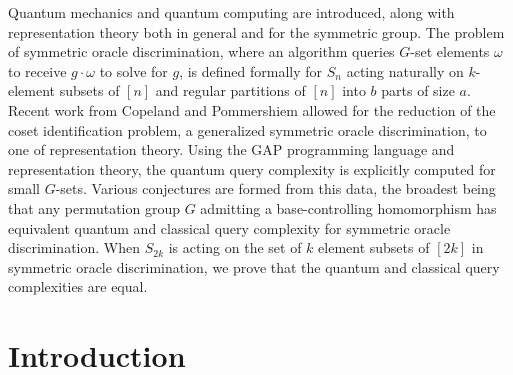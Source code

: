 \documentclass[12pt,twoside]{reedthesis}
\theoremstyle{plain}   %
\theoremstyle{definition}
\theoremstyle{remark}
\numberwithin{equation}{section}
\begin{document}
  Quantum mechanics and quantum computing are introduced, along with representation theory both in general and for the symmetric group.
  The problem of symmetric oracle discrimination, where an algorithm queries $G$-set elements $\omega$ to receive $g \cdot \omega$ to solve for $g$,
  is defined formally for $S_n$ acting naturally on $k$-element subsets of $[n]$ and regular partitions of $[n]$ into $b$ parts of size $a$.
  Recent work from Copeland and Pommershiem allowed for the reduction of the coset identification problem, a generalized symmetric oracle discrimination, to one of representation theory.
  Using the GAP programming language and representation theory, the quantum query complexity is explicitly computed for small $G$-sets.
  Various conjectures are formed from this data, the broadest being that any permutation group $G$ admitting a base-controlling homomorphism has equivalent quantum and classical query complexity for symmetric oracle discrimination.
  When $S_{2k}$ is acting on the set of $k$ element subsets of $[2k]$ in symmetric oracle discrimination, we prove that the quantum and classical query complexities are equal.
  \onehalfspacing



  \chapter*{Introduction}
\end{document}
